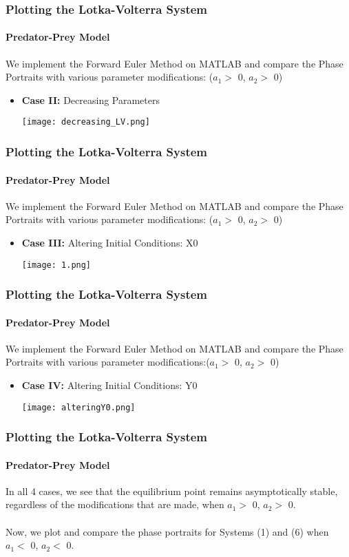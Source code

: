 \documentclass[xcolor={svgnames},hyperref={colorlinks,allcolors=Blue}]{beamer}
\begin{document}
\begin{frame}
\frametitle{Plotting the Lotka-Volterra System}
\framesubtitle{Predator-Prey Model}
We implement the Forward Euler Method on MATLAB and compare the Phase Portraits with various parameter modifications: ($a_1 >$ 0, $a_2 >$ 0) \\ 
\begin{itemize}
\item \textbf{Case II:} Decreasing Parameters
	\begin{center}
		\texttt{[image: decreasing\_LV.png]}
	\end{center}

\end{itemize}
\end{frame}

\begin{frame}
\frametitle{Plotting the Lotka-Volterra System}
\framesubtitle{Predator-Prey Model}
We implement the Forward Euler Method on MATLAB and compare the Phase Portraits with various parameter modifications: ($a_1 >$ 0, $a_2 >$ 0) \\ 
\begin{itemize}
\item \textbf{Case III:} Altering Initial Conditions: X0
	\begin{center}
		\texttt{[image: 1.png]}
	\end{center}

\end{itemize}
\end{frame}

\begin{frame}
\frametitle{Plotting the Lotka-Volterra System}
\framesubtitle{Predator-Prey Model}
We implement the Forward Euler Method on MATLAB and compare the Phase Portraits with various parameter modifications:($a_1 >$ 0, $a_2 >$ 0) \\ 
\begin{itemize}
\item \textbf{Case IV:} Altering Initial Conditions: Y0
	\begin{center}
		\texttt{[image: alteringY0.png]}
	\end{center}

\end{itemize}
\end{frame}

\begin{frame}
\frametitle{Plotting the Lotka-Volterra System}
\framesubtitle{Predator-Prey Model}
In all 4 cases, we see that the equilibrium point remains asymptotically stable, regardless of the modifications that are made, when $a_1 >$ 0, $a_2 >$ 0. \\~\\ Now, we plot and compare the phase portraits for Systems (1) and  (6) when $a_1 <$ 0, $a_2 <$ 0.
\end{frame}
\end{document}
